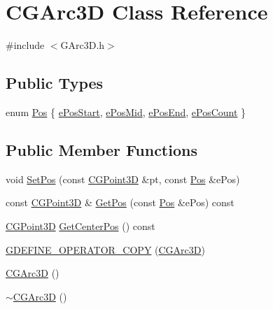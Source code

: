 \hypertarget{class_c_g_arc3_d}{}\section{C\+G\+Arc3\+D Class Reference}
\label{class_c_g_arc3_d}


{\ttfamily \#include $<$G\+Arc3\+D.\+h$>$}

\subsection*{Public Types}
\begin{DoxyCompactItemize}
\item 
enum \hyperlink{class_c_g_arc3_d_ad7acda94d23278f4934f5f0ef04f9811}{Pos} \{ \hyperlink{class_c_g_arc3_d_ad7acda94d23278f4934f5f0ef04f9811a857312bf37e578ec5f12cd66a62b79df}{e\+Pos\+Start}, 
\hyperlink{class_c_g_arc3_d_ad7acda94d23278f4934f5f0ef04f9811a22b6fd2a6281bf135f2046e62b8f947f}{e\+Pos\+Mid}, 
\hyperlink{class_c_g_arc3_d_ad7acda94d23278f4934f5f0ef04f9811aea31d5a995c1e697aa9d7dafdc2f080a}{e\+Pos\+End}, 
\hyperlink{class_c_g_arc3_d_ad7acda94d23278f4934f5f0ef04f9811af278b2804ff43c19aaa6d935d74a1c7a}{e\+Pos\+Count}
 \}
\end{DoxyCompactItemize}
\subsection*{Public Member Functions}
\begin{DoxyCompactItemize}
\item 
void \hyperlink{class_c_g_arc3_d_a11eacabe4d636309bd2762f12a6c62b7}{Set\+Pos} (const \hyperlink{class_c_g_point3_d}{C\+G\+Point3\+D} \&pt, const \hyperlink{class_c_g_arc3_d_ad7acda94d23278f4934f5f0ef04f9811}{Pos} \&e\+Pos)
\item 
const \hyperlink{class_c_g_point3_d}{C\+G\+Point3\+D} \& \hyperlink{class_c_g_arc3_d_a0d2af1ebff170629f558235d454940c3}{Get\+Pos} (const \hyperlink{class_c_g_arc3_d_ad7acda94d23278f4934f5f0ef04f9811}{Pos} \&e\+Pos) const 
\item 
\hyperlink{class_c_g_point3_d}{C\+G\+Point3\+D} \hyperlink{class_c_g_arc3_d_aae6eef9d7b0ce6b9506e297f6e65b155}{Get\+Center\+Pos} () const 
\item 
\hyperlink{class_c_g_arc3_d_a6276fe0b17126f3bb73ce4d8fcf1d987}{G\+D\+E\+F\+I\+N\+E\+\_\+\+O\+P\+E\+R\+A\+T\+O\+R\+\_\+\+C\+O\+P\+Y} (\hyperlink{class_c_g_arc3_d}{C\+G\+Arc3\+D})
\item 
\hyperlink{class_c_g_arc3_d_a6454a97fbf5c1b9242e083478eceed1f}{C\+G\+Arc3\+D} ()
\item 
\hyperlink{class_c_g_arc3_d_ab0f81686b7bb559c38f9c2b0a6de39b6}{$\sim$\+C\+G\+Arc3\+D} ()
\end{DoxyCompactItemize}


